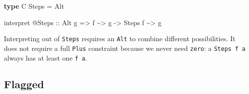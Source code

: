 \documentclass[]{article}
\newenvironment{Shaded}{}{}
\newcommand{\DataTypeTok}[1]{\textcolor[rgb]{0.56,0.13,0.00}{#1}}
\newcommand{\KeywordTok}[1]{\textcolor[rgb]{0.00,0.44,0.13}{\textbf{#1}}}
\newcommand{\NormalTok}[1]{#1}
\newcommand{\OperatorTok}[1]{\textcolor[rgb]{0.40,0.40,0.40}{#1}}
\newcommand{\OtherTok}[1]{\textcolor[rgb]{0.00,0.44,0.13}{#1}}
\begin{document}
\begin{itemize}
\begin{Shaded}
\begin{Highlighting}[]
\KeywordTok{type} \DataTypeTok{C} \DataTypeTok{Steps} \OtherTok{=} \DataTypeTok{Alt}

\NormalTok{interpret }\OperatorTok{@}\DataTypeTok{Steps}
\OtherTok{    ::} \DataTypeTok{Alt}\NormalTok{ g}
    \OtherTok{=>}\NormalTok{ f }\OperatorTok{\textasciitilde{}>}\NormalTok{ g}
    \OtherTok{{-}>} \DataTypeTok{Steps}\NormalTok{ f }\OperatorTok{\textasciitilde{}>}\NormalTok{ g}
\end{Highlighting}
\end{Shaded}

  Interpreting out of \texttt{Steps} requires an \texttt{Alt} to combine
  different possibilities. It does not require a full \texttt{Plus} constraint
  because we never need \texttt{zero}: a \texttt{Steps\ f\ a} always has at
  least one \texttt{f\ a}.
\end{itemize}

\hypertarget{flagged}{%
\subsection{Flagged}\label{flagged}}
\end{document}
